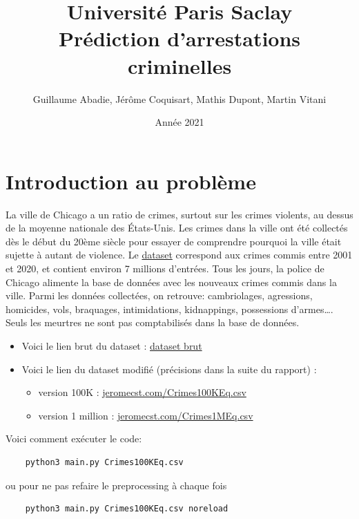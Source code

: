 \documentclass{article}
\title{\textbf{\Huge  Université Paris Saclay}\\ Prédiction d'arrestations criminelles}
\author{Guillaume Abadie, Jérôme Coquisart, Mathis Dupont, Martin Vitani}
\date{Année 2021}
\begin{document}
    \maketitle
    \tableofcontents

    \section{Introduction au problème}
    La ville de Chicago a un ratio de crimes, surtout sur les crimes violents,
    au dessus de la moyenne nationale des États-Unis.
    Les crimes dans la ville ont été collectés dès le début du 20ème siècle pour
    essayer de comprendre pourquoi la ville était sujette à autant de violence.
    Le \href{https://www.kaggle.com/n3v375/chicago-crime-from-01jan2001-to-22jul2020}{dataset} correspond aux crimes commis entre 2001 et 2020, et contient environ 
    7 millions d'entrées.
    Tous les jours, la police de Chicago alimente la base de données avec les
    nouveaux crimes commis dans la ville. 
    Parmi les données collectées, on retrouve: 
    cambriolages, agressions, homicides, vols, braquages, intimidations, kidnappings, 
    possessions d'armes\dots.
    Seuls les meurtres ne sont pas comptabilisés dans la base de données.

    \begin{itemize}
	    \item Voici le lien brut du dataset :
		    \href{https://www.kaggle.com/n3v375/chicago-crime-from-01jan2001-to-22jul2020}{dataset brut}
	    \item Voici le lien du dataset modifié (précisions dans la suite du rapport) :
		    \begin{itemize}
			    \item version 100K :
				    \href{https://jeromecst.com/Crimes100KEq.csv}{jeromecst.com/Crimes100KEq.csv}
			    \item version 1 million :
				    \href{https://jeromecst.com/Crimes1MEq.csv}{jeromecst.com/Crimes1MEq.csv}
		    \end{itemize}
    \end{itemize}

    Voici comment exécuter le code:
    \begin{Verbatim}
    python3 main.py Crimes100KEq.csv
    \end{Verbatim}
    ou pour ne pas refaire le preprocessing à chaque fois
    \begin{Verbatim}
    python3 main.py Crimes100KEq.csv noreload
    \end{Verbatim}
\end{document}
